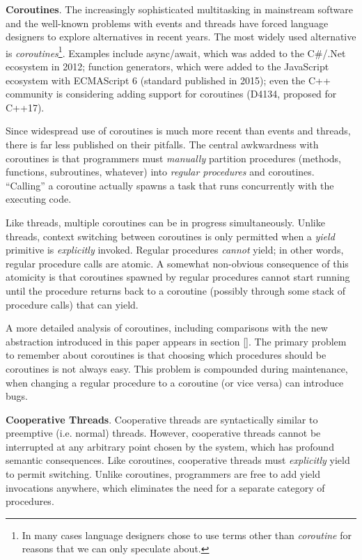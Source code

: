 \documentclass[10pt,preprint]{sigplanconf}
\begin{document}
\textbf{Coroutines}.
The increasingly sophisticated multitasking in mainstream software and the well-known problems with events and threads have forced language designers to explore alternatives in recent years.
The most widely used alternative is \emph{coroutines}\footnote{In many cases language designers chose to use terms other than \emph{coroutine} for reasons that we can only speculate about.}.
Examples include async/await, which was added to the C\#/.Net ecosystem in 2012; function generators, which were added to the JavaScript ecosystem with ECMAScript 6 (standard published in 2015); even the C++ community is considering adding support for coroutines (D4134, proposed for C++17).

Since widespread use of coroutines is much more recent than events and threads, there is far less published on their pitfalls.
The central awkwardness with coroutines is that programmers must \emph{manually} partition procedures (methods, functions, subroutines, whatever) into \emph{regular procedures} and coroutines.
``Calling'' a coroutine actually spawns a task that runs concurrently with the executing code.

Like threads, multiple coroutines can be in progress simultaneously.
Unlike threads, context switching between coroutines is only permitted when a \emph{yield} primitive is \emph{explicitly} invoked.
Regular procedures \emph{cannot} yield; in other words, regular procedure calls are atomic.
A somewhat non-obvious consequence of this atomicity is that coroutines spawned by regular procedures cannot start running until the procedure returns back to a coroutine (possibly through some stack of procedure calls) that can yield.

A more detailed analysis of coroutines, including comparisons with the new abstraction introduced in this paper appears in section \ref{}.
The primary problem to remember about coroutines is that choosing which procedures should be coroutines is not always easy.
This problem is compounded during maintenance, when changing a regular procedure to a coroutine (or vice versa) can introduce bugs.

\textbf{Cooperative Threads}.
Cooperative threads are syntactically similar to preemptive (i.e. normal) threads.
However, cooperative threads cannot be interrupted at any arbitrary point chosen by the system, which has profound semantic consequences.
Like coroutines, cooperative threads must \emph{explicitly} yield to permit switching.
Unlike coroutines, programmers are free to add yield invocations anywhere, which eliminates the need for a separate category of procedures.
\end{document}
